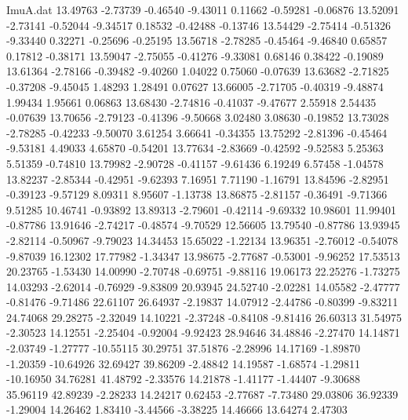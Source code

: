 \begin{filecontents}{ImuA.dat}
  13.49763   -2.73739   -0.46540   -9.43011    0.11662   -0.59281   -0.06876
  13.52091   -2.73141   -0.52044   -9.34517    0.18532   -0.42488   -0.13746
  13.54429   -2.75414   -0.51326   -9.33440    0.32271   -0.25696   -0.25195
  13.56718   -2.78285   -0.45464   -9.46840    0.65857    0.17812   -0.38171
  13.59047   -2.75055   -0.41276   -9.33081    0.68146    0.38422   -0.19089
  13.61364   -2.78166   -0.39482   -9.40260    1.04022    0.75060   -0.07639
  13.63682   -2.71825   -0.37208   -9.45045    1.48293    1.28491    0.07627
  13.66005   -2.71705   -0.40319   -9.48874    1.99434    1.95661    0.06863
  13.68430   -2.74816   -0.41037   -9.47677    2.55918    2.54435   -0.07639
  13.70656   -2.79123   -0.41396   -9.50668    3.02480    3.08630   -0.19852
  13.73028   -2.78285   -0.42233   -9.50070    3.61254    3.66641   -0.34355
  13.75292   -2.81396   -0.45464   -9.53181    4.49033    4.65870   -0.54201
  13.77634   -2.83669   -0.42592   -9.52583    5.25363    5.51359   -0.74810
  13.79982   -2.90728   -0.41157   -9.61436    6.19249    6.57458   -1.04578
  13.82237   -2.85344   -0.42951   -9.62393    7.16951    7.71190   -1.16791
  13.84596   -2.82951   -0.39123   -9.57129    8.09311    8.95607   -1.13738
  13.86875   -2.81157   -0.36491   -9.71366    9.51285   10.46741   -0.93892
  13.89313   -2.79601   -0.42114   -9.69332   10.98601   11.99401   -0.87786
  13.91646   -2.74217   -0.48574   -9.70529   12.56605   13.79540   -0.87786
  13.93945   -2.82114   -0.50967   -9.79023   14.34453   15.65022   -1.22134
  13.96351   -2.76012   -0.54078   -9.87039   16.12302   17.77982   -1.34347
  13.98675   -2.77687   -0.53001   -9.96252   17.53513   20.23765   -1.53430
  14.00990   -2.70748   -0.69751   -9.88116   19.06173   22.25276   -1.73275
  14.03293   -2.62014   -0.76929   -9.83809   20.93945   24.52740   -2.02281
  14.05582   -2.47777   -0.81476   -9.71486   22.61107   26.64937   -2.19837
  14.07912   -2.44786   -0.80399   -9.83211   24.74068   29.28275   -2.32049
  14.10221   -2.37248   -0.84108   -9.81416   26.60313   31.54975   -2.30523
  14.12551   -2.25404   -0.92004   -9.92423   28.94646   34.48846   -2.27470
  14.14871   -2.03749   -1.27777  -10.55115   30.29751   37.51876   -2.28996
  14.17169   -1.89870   -1.20359  -10.64926   32.69427   39.86209   -2.48842
  14.19587   -1.68574   -1.29811  -10.16950   34.76281   41.48792   -2.33576
  14.21878   -1.41177   -1.44407   -9.30688   35.96119   42.89239   -2.28233
  14.24217    0.62453   -2.77687   -7.73480   29.03806   36.92339   -1.29004
  14.26462    1.83410   -3.44566   -3.38225   14.46666   13.64274    2.47303

\end{filecontents}
